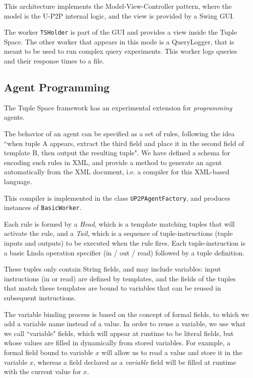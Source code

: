 \documentclass[titlepage]{article}%
\begin{document}
This architecture implements the Model-View-Controller pattern, where the model is the U-P2P internal logic, and the view is provided by a Swing GUI.

The worker \verb.TSHolder. is part of the GUI and provides a view inside the Tuple Space. The other worker that appears in this mode is a QueryLogger, that is meant to be used to run complex query experiments. This worker logs queries and their response times to a file.

\subsection{Agent Programming}
\label{sec:AgentProgramming}

The Tuple Space framework has an experimental extension for \emph{programming} agents.

The behavior of an agent can be specified as a set of rules, following the idea ``when tuple A appears, extract the third field and place it in the second field of template B, then output the resulting tuple". We have defined a schema for encoding such rules in XML, and provide a method to generate an agent automatically from the XML document, i.e. a compiler for this XML-based language.

This compiler is implemented in the class \verb.UP2PAgentFactory., and produces instances of \verb.BasicWorker..

Each rule is formed by a \emph{Head}, which is a template matching tuples that will activate the rule, and a \emph{Tail}, which is a sequence of tuple-instructions (tuple inputs and outputs) to be executed when the rule fires. Each tuple-instruction is a basic Linda operation specifier (in / out / read) followed by a tuple definition.

These tuples only contain String fields, and may include variables: input instructions (in or read) are defined by templates, and the fields of the tuples that match these templates are bound to variables that can be reused in subsequent instructions.

The variable binding process is based on the concept of formal fields, to which we add a variable name instead of a value. In order to reuse a variable, we use what we call ``variable" fields, which will appear at runtime to be literal fields, but whose values are filled in dynamically from stored variables. For example, a formal field bound to variable $x$ will allow us to read a value and store it in the variable $x$, whereas a field declared as a \emph{variable} field will be filled at runtime with the current value for $x$.
\end{document}
